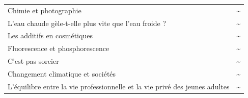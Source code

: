 \documentclass[
  10pt,
  french,
  a5paper,
  openany]{book}
\begin{document}
\begin{longtable}[]{@{}lc@{}}
\begin{minipage}[t]{0.88\columnwidth}\raggedright
Chimie et photographie\strut
\end{minipage} & \begin{minipage}[t]{0.06\columnwidth}\centering
\textasciitilde{}\strut
\end{minipage}\tabularnewline
\begin{minipage}[t]{0.88\columnwidth}\raggedright
L'eau chaude gèle-t-elle plus vite que l'eau froide ?\strut
\end{minipage} & \begin{minipage}[t]{0.06\columnwidth}\centering
\textasciitilde{}\strut
\end{minipage}\tabularnewline
\begin{minipage}[t]{0.88\columnwidth}\raggedright
Les additifs en cosmétiques\strut
\end{minipage} & \begin{minipage}[t]{0.06\columnwidth}\centering
\textasciitilde{}\strut
\end{minipage}\tabularnewline
\begin{minipage}[t]{0.88\columnwidth}\raggedright
Fluorescence et phosphorescence\strut
\end{minipage} & \begin{minipage}[t]{0.06\columnwidth}\centering
\textasciitilde{}\strut
\end{minipage}\tabularnewline
\begin{minipage}[t]{0.88\columnwidth}\raggedright
C'est pas sorcier\strut
\end{minipage} & \begin{minipage}[t]{0.06\columnwidth}\centering
\textasciitilde{}\strut
\end{minipage}\tabularnewline
\begin{minipage}[t]{0.88\columnwidth}\raggedright
Changement climatique et sociétés\strut
\end{minipage} & \begin{minipage}[t]{0.06\columnwidth}\centering
\textasciitilde{}\strut
\end{minipage}\tabularnewline
\begin{minipage}[t]{0.88\columnwidth}\raggedright
L'équilibre entre la vie professionnelle et la vie privé des jeunes adultes\strut
\end{minipage} & \begin{minipage}[t]{0.06\columnwidth}\centering
\textasciitilde{}\strut
\end{minipage}\tabularnewline

\end{longtable}
\end{document}
